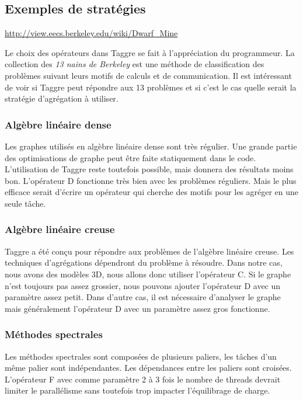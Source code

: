 \subsection{Exemples de stratégies}
\url{http://view.eecs.berkeley.edu/wiki/Dwarf_Mine}

Le choix des opérateurs dans Taggre se fait à l'appréciation du programmeur.
%
La collection des {\em 13 nains de Berkeley} est une méthode de classification des problèmes suivant leurs motifs de calculs et de communication.
%
Il est intéressant de voir si Taggre peut répondre aux 13 problèmes et si c'est le cas quelle serait la stratégie d'agrégation à utiliser.

\subsubsection{Algèbre linéaire dense}
Les graphes utilisés en algèbre linéaire dense sont très régulier.
%
Une grande partie des optimisations de graphe peut être faite statiquement dans le code.
%
L'utilisation de Taggre reste toutefois possible, mais donnera des résultats moins bon.
%
L'opérateur D fonctionne très bien avec les problèmes réguliers.
%
Mais le plus efficace serait d'écrire un opérateur qui cherche des motifs pour les agréger en une seule tâche.


\subsubsection{Algèbre linéaire creuse}
Taggre a été conçu pour répondre aux problèmes de l'algèbre linéaire creuse.
%
Les techniques d'agrégations dépendront du problème à résoudre.
%
Dans notre cas, nous avons des modèles 3D, nous allons donc utiliser l'opérateur C.
%
Si le graphe n'est toujours pas assez grossier, nous pouvons ajouter l'opérateur D avec un paramètre assez petit.
%
Dans d'autre cas, il est nécessaire d'analyser le graphe mais généralement l'opérateur D avec un paramètre assez gros fonctionne.



\subsubsection{Méthodes spectrales}
Les méthodes spectrales sont composées de plusieurs paliers, les tâches d'un même palier sont indépendantes.
%
Les dépendances entre les paliers sont croisées.
%
L'opérateur F avec comme paramètre 2 à 3 fois le nombre de threads devrait limiter le parallélisme sans toutefois trop impacter l'équilibrage de charge.



